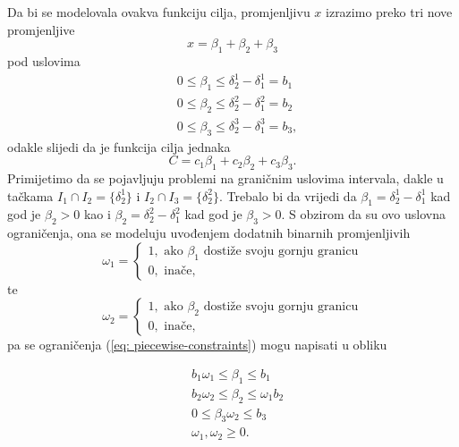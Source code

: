 \documentclass[b5paper, utf8, 11pt, colorlinks]{book}
\theoremstyle{definition}
\begin{document}
Da bi se modelovala ovakva funkciju cilja, promjenljivu $x$ izrazimo preko tri nove promjenljive 
$$x = \beta_1 + \beta_2 + \beta_3$$
pod uslovima 
\begin{align}
	&0   \leq \beta_1 \leq \delta^1_2 - \delta^1_1 = b_1 \nonumber \\
	&0  \leq \beta_2 \leq \delta^2_2 - \delta^2_1 = b_2 \nonumber \\
	&0  \leq \beta_3 \leq \delta^3_2- \delta^3_1 = b_3, \label{eq: piecewise-constraints}
\end{align}
odakle slijedi da je funkcija cilja   jednaka 
$$ C = c_1 \beta_1 + c_2 \beta_2 + c_3 \beta_3.$$ 
Primijetimo da se pojavljuju problemi na graničnim uslovima intervala, dakle u tačkama $I_1 \cap I_2 =\{\delta^1_2\}$ i $I_2 \cap I_3 =\{\delta^2_2\}$. Trebalo bi da vrijedi da $\beta_1 =  \delta^1_2 - \delta^1_1$ kad god je $\beta_2  > 0$ kao i $\beta_2 =  \delta^2_2 - \delta^2_1$ kad god je $\beta_3  > 0$.  S obzirom da su ovo uslovna ograničenja, ona se modeluju uvođenjem dodatnih binarnih promjenljivih 
$$ \omega_1 = \begin{cases}
	1, \mbox{ ako } \beta_1 \mbox{ dostiže svoju gornju granicu} \\
	0, \mbox{ inače},
\end{cases}$$
te 
$$ \omega_2 = \begin{cases}
	1, \mbox{ ako } \beta_2 \mbox{ dostiže svoju gornju granicu} \\
	0, \mbox{ inače}, 
\end{cases}$$
pa se ograničenja (\ref{eq: piecewise-constraints}) mogu napisati u obliku

\begin{align}
	& b_1 \omega_1 \leq \beta_1 \leq b_1   \nonumber \\
	& b_2 \omega_2 \leq \beta_2 \leq \omega_1 b_2 \nonumber \\
	& 0 \leq \beta_3  \omega_2 \leq b_3\nonumber \\
	& \omega_1, \omega_2 \geq 0. \label{eq: piecewise-constraints-equivalent}
\end{align}
\end{document}
